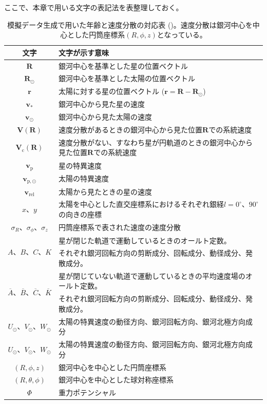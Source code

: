 ここで、本章で用いる文字の表記法を表整理しておく。
\begin{table}
\begin{center}
\begin{tabular}{c|l} \hline
 \rowcolor{LightCyan}
 文字 & 文字が示す意味\\
 \hline
 $\pmb{R}$ & 銀河中心を基準とした星の位置ベクトル\\
 \hline
 $\pmb{R_{\odot}}$ & 銀河中心を基準とした太陽の位置ベクトル\\
 \hline
 $\pmb{r}$ & 太陽に対する星の位置ベクトル ($\pmb{r}=\pmb{R}-\pmb{R_{\odot}}$)\\
 \hline
 $\pmb{v}_*$ & 銀河中心から見た星の速度\\
 \hline
 $\pmb{v}_{\odot}$ & 銀河中心から見た太陽の速度\\
 \hline
 $\pmb{V}(\pmb{R})$ & 速度分散があるときの銀河中心から見た位置$\pmb{R}$での系統速度\\
 \hline
 $\pmb{V}_{\mathrm{c}}(\pmb{R})$ & 速度分散がない、すなわち星が円軌道のときの銀河中心から見た位置$\pmb{R}$での系統速度\\
 \hline
 $\pmb{v}_{\mathrm{p}}$ & 星の特異速度\\
 \hline
 $\pmb{v}_{\mathrm{p},\odot}$ & 太陽の特異速度\\
 \hline
 $\pmb{v}_{\mathrm{rel}}$ & 太陽から見たときの星の速度\\
 \hline
 $x、y$ & 太陽を中心とした直交座標系におけるそれぞれ銀経$l=0^{\circ}、90^{\circ}$の向きの座標\\
 \hline
 $\sigma_R、\sigma_{\phi}、\sigma_z$ & 円筒座標系で表された速度の速度分散\\
 \hline
 \multirow{2}{*}{$A、B、C、K$} & 星が閉じた軌道で運動しているときのオールト定数。\\
    & それぞれ銀河回転方向の剪断成分、回転成分、動径成分、発散成分。 \tabularnewline[\doublerulesep] 
 \hline
 \multirow{2}{*}{$\overline{A}、\overline{B}、\overline{C}、\overline{K}$} & 星が閉じていない軌道で運動しているときの平均速度場のオールト定数。\\
   & それぞれ銀河回転方向の剪断成分、回転成分、動径成分、発散成分。 \tabularnewline[\doublerulesep] 
 \hline
 $U_{\odot}、V_{\odot}、W_{\odot}$ & 太陽の特異速度の動径方向、銀河回転方向、銀河北極方向成分\\
 \hline
 $U_{\odot}、V_{\odot}、W_{\odot}$ & 太陽の特異速度の動径方向、銀河回転方向、銀河北極方向成分\\
 \hline
 $(R,\phi,z)$ & 銀河中心を中心とした円筒座標系\\
 \hline
 $(R,\theta,\phi)$ & 銀河中心を中心とした球対称座標系\\
 \hline
 $\Phi$ & 重力ポテンシャル\\
 \hline
\end{tabular} \label{notation}
\vspace{3mm}
\caption{模擬データ生成で用いた年齢と速度分散の対応表 (\cite{YL18})。速度分散は銀河中心を中心とした円筒座標系$(R,\phi,z)$となっている。}
\end{center}
\end{table}

